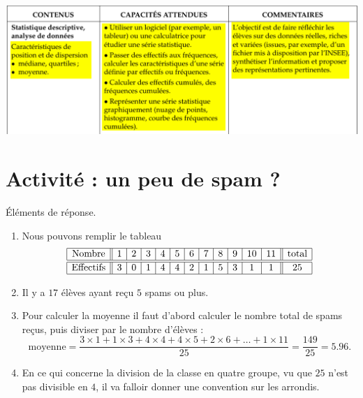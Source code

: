 
\includegraphics[width=\linewidth]{BO_statistique_descriptive.pdf}

\setcounter{section}{-1}
\section{Activité : un peu de spam ?}



Éléments de réponse.

\begin{enumerate}
    \item
Nous pouvons remplir le tableau
\begin{equation*}
    \begin{array}[]{|c||c|c|c|c|c|c|c|c|c|c|c|| c |}
        \hline
        \text{Nombre}&1&2&3&4&5&6&7&8&9&10&11&\text{total}\\
        \hline\hline
        \text{Effectifs}&3&0&1&4&4&2&1&5&3&1&1&25\\
        \hline
    \end{array}
\end{equation*}
\item
Il y a \( 17\) élèves ayant reçu \( 5\) spams ou plus.
     \item
         Pour calculer la moyenne il faut d'abord calculer le nombre total de spams reçus, puis diviser par le nombre d'élèves :
         \begin{equation}
             \text{moyenne}=\frac{ 3\times 1+1\times 3+4\times 4+4\times 5+2\times 6+\ldots+1\times 11 }{ 25 }=\frac{ 149 }{ 25 }=5.96.            
         \end{equation}
     \item
         En ce qui concerne la division de la classe en quatre groupe, vu que \( 25\) n'est pas divisible en \( 4\), il va falloir donner une convention sur les arrondis.
\end{enumerate}

